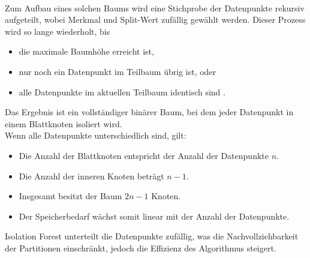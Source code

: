 \documentclass[a4paper,12pt]{article}
\begin{document}
	\\[0.5em]
	Zum Aufbau eines solchen Baums wird eine Stichprobe der Datenpunkte rekursiv aufgeteilt, wobei Merkmal und Split-Wert zufällig gewählt werden. Dieser Prozess wird so lange wiederholt, bis  
	\begin{itemize}
		\item die maximale Baumhöhe erreicht ist,
		\item nur noch ein Datenpunkt im Teilbaum übrig ist, oder
		\item alle Datenpunkte im aktuellen Teilbaum identisch sind \cite[S.3]{liu2008isolation}.
	\end{itemize}
	Das Ergebnis ist ein vollständiger binärer Baum, bei dem jeder Datenpunkt in einem Blattknoten isoliert wird.
	\\[0.5em]
	Wenn alle Datenpunkte unterschiedlich sind, gilt:  
	\begin{itemize}
		\item Die Anzahl der Blattknoten entspricht der Anzahl der Datenpunkte \(n\).  
		\item Die Anzahl der inneren Knoten beträgt \(n-1\).  
		\item Insgesamt besitzt der Baum \(2n-1\) Knoten.  
		\item Der Speicherbedarf wächst somit linear mit der Anzahl der Datenpunkte.
	\end{itemize}
	Isolation Forest unterteilt die Datenpunkte zufällig, was die Nachvollziehbarkeit der Partitionen einschränkt, jedoch die Effizienz des Algorithmus steigert.
	
\end{document}
